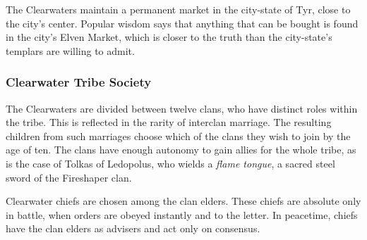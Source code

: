 The Clearwaters maintain a permanent market in the city-state of Tyr, close to the city's center. Popular wisdom says that anything that can be bought is found in the city's Elven Market, which is closer to the truth than the city-state's templars are willing to admit.

\subsubsection{Clearwater Tribe Society}
The Clearwaters are divided between twelve clans, who have distinct roles within the tribe. This is reflected in the rarity of interclan marriage. The resulting children from such marriages choose which of the clans they wish to join by the age of ten. The clans have enough autonomy to gain allies for the whole tribe, as is the case of Tolkas of Ledopolus, who wields a \emph{flame tongue}, a sacred steel sword of the Fireshaper clan.

Clearwater chiefs are chosen among the clan elders. These chiefs are absolute only in battle, when orders are obeyed instantly and to the letter. In peacetime, chiefs have the clan elders as advisers and act only on consensus.







